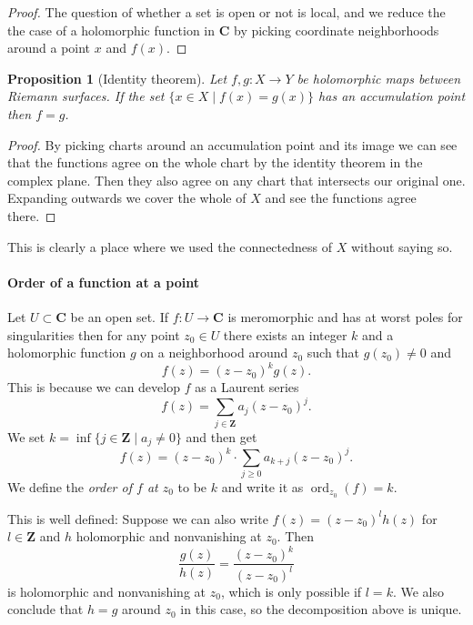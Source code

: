 \documentclass[11pt]{article}
\newtheorem{prop}[theo]{Proposition}
\theoremstyle{definition}
\def\CC{\mathbf{C}}
\def\ZZ{\mathbf{Z}}
\DeclareMathOperator{\ord}{ord}
\begin{document}
\begin{proof}
The question of whether a set is open or not is local, and
we reduce the the case of a holomorphic function in $\CC$ by picking coordinate
neighborhoods around a point $x$ and $f(x)$.
\end{proof}




\begin{prop}[Identity theorem]
Let $f,g : X \to Y$ be holomorphic maps between Riemann surfaces.
If the set $\{ x \in X \mid f(x) = g(x) \}$ has an accumulation point
then $f = g$.
\end{prop}

\begin{proof}
By picking charts around an accumulation point and its image we can see that
the functions agree on the whole chart by the identity theorem in the complex plane.
Then they also agree on any chart that intersects our original one.
Expanding outwards we cover the whole of $X$ and see the functions agree there.
\end{proof}

This is clearly a place where we used the connectedness of $X$ without saying so.



\paragraph{Order of a function at a point}


Let $U \subset \CC$ be an open set.
If $f : U \to \CC$ is meromorphic and has at worst poles for singularities then
for any point $z_0 \in U$ there exists an integer $k$ and a holomorphic
function $g$ on a neighborhood around $z_0$ such that $g(z_0) \not= 0$ and
$$
f(z) = (z - z_0)^k g(z).
$$
This is because we can develop $f$ as a Laurent series
$$
f(z) = \sum_{j\in\ZZ} a_j (z - z_0)^j.
$$
We set $k = \inf\{ j \in \ZZ \mid a_j \not= 0 \}$ and then get
$$
f(z) = (z - z_0)^k \cdot \sum_{j \geq 0} a_{k+j} (z - z_0)^j.
$$
We define the \emph{order of $f$ at $z_0$} to be $k$ and write it as
$\ord_{z_0}(f) = k$.

This is well defined:
Suppose we can also write $f(z) = (z - z_0)^l h(z)$ for $l \in \ZZ$ and $h$
holomorphic and nonvanishing at $z_0$. Then
$$
\frac{g(z)}{h(z)} = \frac{(z - z_0)^k}{(z - z_0)^l}
$$
is holomorphic and nonvanishing at $z_0$, which is only possible if $l = k$.
We also conclude that $h = g$ around $z_0$ in this case, so the decomposition
above is unique.
\end{document}
